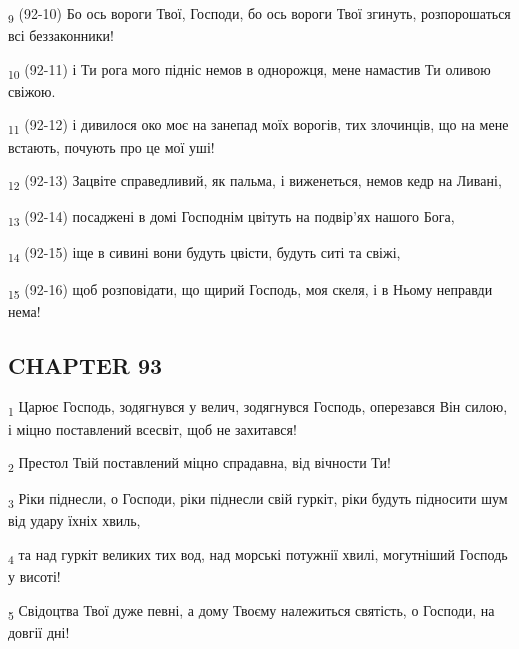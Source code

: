 \begin{tcolorbox}
\textsubscript{9} (92-10) Бо ось вороги Твої, Господи, бо ось вороги Твої згинуть, розпорошаться всі беззаконники!
\end{tcolorbox}
\begin{tcolorbox}
\textsubscript{10} (92-11) і Ти рога мого підніс немов в однорожця, мене намастив Ти оливою свіжою.
\end{tcolorbox}
\begin{tcolorbox}
\textsubscript{11} (92-12) і дивилося око моє на занепад моїх ворогів, тих злочинців, що на мене встають, почують про це мої уші!
\end{tcolorbox}
\begin{tcolorbox}
\textsubscript{12} (92-13) Зацвіте справедливий, як пальма, і виженеться, немов кедр на Ливані,
\end{tcolorbox}
\begin{tcolorbox}
\textsubscript{13} (92-14) посаджені в домі Господнім цвітуть на подвір'ях нашого Бога,
\end{tcolorbox}
\begin{tcolorbox}
\textsubscript{14} (92-15) іще в сивині вони будуть цвісти, будуть ситі та свіжі,
\end{tcolorbox}
\begin{tcolorbox}
\textsubscript{15} (92-16) щоб розповідати, що щирий Господь, моя скеля, і в Ньому неправди нема!
\end{tcolorbox}
\subsection{CHAPTER 93}
\begin{tcolorbox}
\textsubscript{1} Царює Господь, зодягнувся у велич, зодягнувся Господь, оперезався Він силою, і міцно поставлений всесвіт, щоб не захитався!
\end{tcolorbox}
\begin{tcolorbox}
\textsubscript{2} Престол Твій поставлений міцно спрадавна, від вічности Ти!
\end{tcolorbox}
\begin{tcolorbox}
\textsubscript{3} Ріки піднесли, о Господи, ріки піднесли свій гуркіт, ріки будуть підносити шум від удару їхніх хвиль,
\end{tcolorbox}
\begin{tcolorbox}
\textsubscript{4} та над гуркіт великих тих вод, над морські потужнії хвилі, могутніший Господь у висоті!
\end{tcolorbox}
\begin{tcolorbox}
\textsubscript{5} Свідоцтва Твої дуже певні, а дому Твоєму належиться святість, о Господи, на довгії дні!
\end{tcolorbox}
